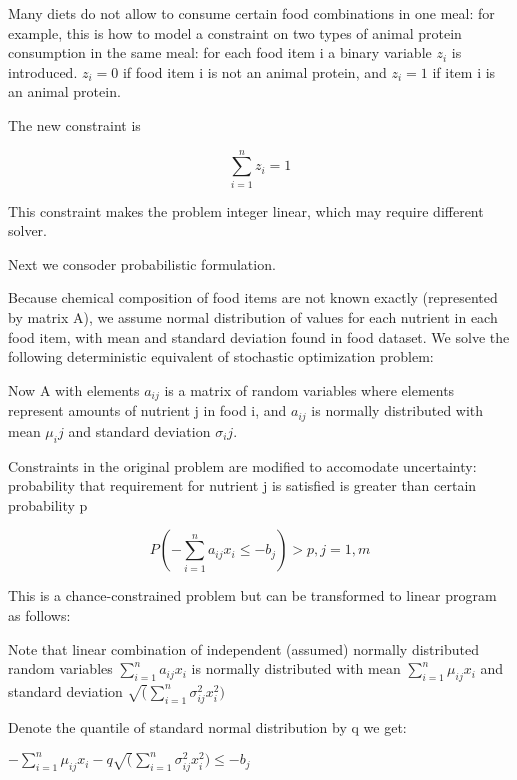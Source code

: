 \documentclass{article} %
\begin{document}
Many diets do not allow to consume certain food combinations in one meal: for example, this is how to model a constraint on two types of animal protein consumption in the same meal: for each food item i a binary variable $ z_i$ is introduced.  $z_i=0$ if food item i is not an animal protein, and $ z_i=1$ if item i is an animal protein.

The new constraint is


   \begin{equation} %
    \sum_{i=1}^{n}z_i=1
    \end{equation}

This constraint makes the problem integer linear, which may require different solver.

Next we consoder probabilistic formulation.

Because chemical composition of food items are not known exactly (represented by matrix A), we assume normal distribution of values for each nutrient in each food item, with mean and standard deviation found in food dataset. We solve the following deterministic equivalent of stochastic optimization problem:

Now A with elements $a_{ij}$ is a matrix of random variables where elements represent amounts of nutrient j in food i, and $a_{ij}$ is normally distributed with mean $\mu_ij$ and standard deviation $\sigma_ij$. 


Constraints in the original problem are modified to accomodate uncertainty: probability that requirement for nutrient j is satisfied is greater than certain probability p 

   \begin{equation} %
  P(  -\sum_{i=1}^{n}{a_{ij}x_i}\le - b_j) >p, j=1,m
    \end{equation}

This is a chance-constrained problem but can be transformed to linear program as follows:

Note that linear combination  of independent (assumed) normally distributed random variables $\sum_{i=1}^{n}{a_{ij}x_i}$ is normally distributed with mean  $\sum_{i=1}^{n}{\mu_{ij}x_i}$  and standard deviation  $\sqrt (\sum_{i=1}^{n}{\sigma_{ij}^2x_i^2})$ 

Denote the quantile of standard normal distribution by q we get:

$-\sum_{i=1}^{n}{\mu_{ij}x_i}-q \sqrt (\sum_{i=1}^{n}{\sigma_{ij}^2x_i^2}) \le -b_j$ 
\end{document}
